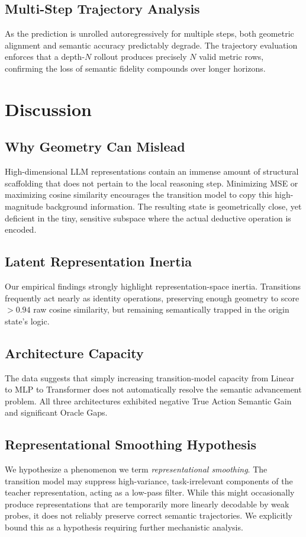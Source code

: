 \documentclass[conference]{IEEEtran}
\begin{document}
\subsection{Multi-Step Trajectory Analysis}
As the prediction is unrolled autoregressively for multiple steps, both geometric alignment and semantic accuracy predictably degrade. The trajectory evaluation enforces that a depth-$N$ rollout produces precisely $N$ valid metric rows, confirming the loss of semantic fidelity compounds over longer horizons.

\section{Discussion}

\subsection{Why Geometry Can Mislead}
High-dimensional LLM representations contain an immense amount of structural scaffolding that does not pertain to the local reasoning step. Minimizing MSE or maximizing cosine similarity encourages the transition model to copy this high-magnitude background information. The resulting state is geometrically close, yet deficient in the tiny, sensitive subspace where the actual deductive operation is encoded.

\subsection{Latent Representation Inertia}
Our empirical findings strongly highlight representation-space inertia. Transitions frequently act nearly as identity operations, preserving enough geometry to score $>0.94$ raw cosine similarity, but remaining semantically trapped in the origin state's logic.

\subsection{Architecture Capacity}
The data suggests that simply increasing transition-model capacity from Linear to MLP to Transformer does not automatically resolve the semantic advancement problem. All three architectures exhibited negative True Action Semantic Gain and significant Oracle Gaps.

\subsection{Representational Smoothing Hypothesis}
We hypothesize a phenomenon we term \textit{representational smoothing}. The transition model may suppress high-variance, task-irrelevant components of the teacher representation, acting as a low-pass filter. While this might occasionally produce representations that are temporarily more linearly decodable by weak probes, it does not reliably preserve correct semantic trajectories. We explicitly bound this as a hypothesis requiring further mechanistic analysis.
\end{document}

